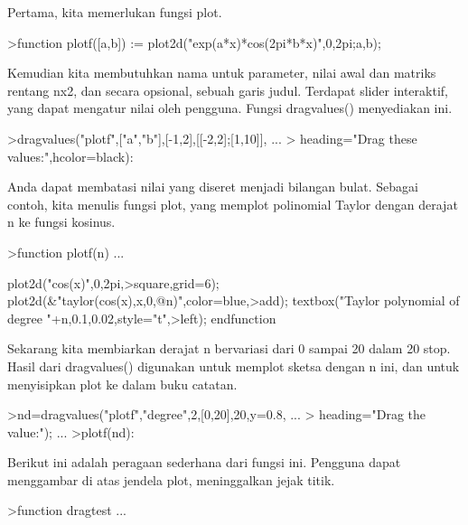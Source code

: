 \documentclass[12pt,arial,letterpaper]{book}
\begin{document}
\begin{eulercomment}
\begin{eulercomment}
\begin{eulercomment}
\begin{eulercomment}
\begin{eulercomment}
\begin{eulercomment}
\begin{eulercomment}
\begin{eulercomment}
\begin{eulercomment}
\begin{eulercomment}
\begin{eulercomment}
\begin{eulercomment}
\begin{eulercomment}
\begin{eulercomment}
\begin{eulercomment}
\begin{eulercomment}
\begin{eulercomment}
Pertama, kita memerlukan fungsi plot.
\end{eulercomment}
\begin{eulerprompt}
>function plotf([a,b]) := plot2d("exp(a*x)*cos(2pi*b*x)",0,2pi;a,b);
\end{eulerprompt}
\begin{eulercomment}
Kemudian kita membutuhkan nama untuk parameter, nilai awal dan matriks
rentang nx2, dan secara opsional, sebuah garis judul. Terdapat slider
interaktif, yang dapat mengatur nilai oleh pengguna. Fungsi
dragvalues() menyediakan ini.
\end{eulercomment}
\begin{eulerprompt}
>dragvalues("plotf",["a","b"],[-1,2],[[-2,2];[1,10]], ...
>  heading="Drag these values:",hcolor=black):
\end{eulerprompt}
\begin{eulercomment}
Anda dapat membatasi nilai yang diseret menjadi bilangan bulat.
Sebagai contoh, kita menulis fungsi plot, yang memplot polinomial
Taylor dengan derajat n ke fungsi kosinus.
\end{eulercomment}
\begin{eulerprompt}
>function plotf(n) ...
\end{eulerprompt}
\begin{eulerudf}
  plot2d("cos(x)",0,2pi,>square,grid=6);
  plot2d(&"taylor(cos(x),x,0,@n)",color=blue,>add);
  textbox("Taylor polynomial of degree "+n,0.1,0.02,style="t",>left);
  endfunction
\end{eulerudf}
\begin{eulercomment}
Sekarang kita membiarkan derajat n bervariasi dari 0 sampai 20 dalam
20 stop. Hasil dari dragvalues() digunakan untuk memplot sketsa dengan
n ini, dan untuk menyisipkan plot ke dalam buku catatan.
\end{eulercomment}
\begin{eulerprompt}
>nd=dragvalues("plotf","degree",2,[0,20],20,y=0.8, ...
>   heading="Drag the value:"); ...
>plotf(nd):
\end{eulerprompt}
\begin{eulercomment}
Berikut ini adalah peragaan sederhana dari fungsi ini. Pengguna dapat
menggambar di atas jendela plot, meninggalkan jejak titik.
\end{eulercomment}
\begin{eulerprompt}
>function dragtest ...

\end{eulerprompt}
\end{eulercomment}
\end{eulercomment}
\end{eulercomment}
\end{eulercomment}
\end{eulercomment}
\end{eulercomment}
\end{eulercomment}
\end{eulercomment}
\end{eulercomment}
\end{eulercomment}
\end{eulercomment}
\end{eulercomment}
\end{eulercomment}
\end{eulercomment}
\end{eulercomment}
\end{eulercomment}
\end{document}
